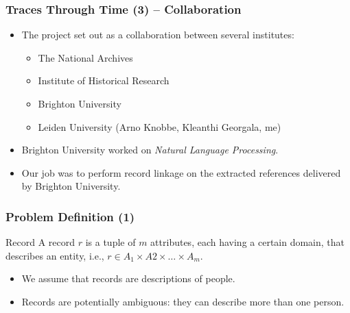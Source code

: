 \documentclass[12pt]{beamer}
\theoremstyle{break}
\begin{document}


\begin{frame}
	\frametitle{Traces Through Time (3) -- Collaboration}
	
	\begin{itemize}
		\item The project set out as a collaboration between several institutes: \begin{itemize}
			\item The National Archives
			\item Institute of Historical Research
			\item Brighton University
			\item Leiden University (Arno Knobbe, Kleanthi Georgala, me)
			\end{itemize}
		\item Brighton University worked on \emph{Natural Language Processing}.
		\item Our job was to perform record linkage on the extracted references delivered by Brighton University.
	\end{itemize}
	
\end{frame}



\begin{frame}
	\frametitle{Problem Definition (1)}
	
	\begin{block}{Record}
		A record $r$ is a tuple of $m$ attributes, each having a certain domain, that describes an entity, i.e., $r \in A_1 \times A2 \times \dots \times A_m$.
	\end{block}
	
	\begin{itemize}
	  	\item We assume that records are \alert{descriptions} of people.
	  	\item Records are potentially \alert{ambiguous}: they can describe more than one person.
	\end{itemize}
	
\end{frame}


\end{document}
